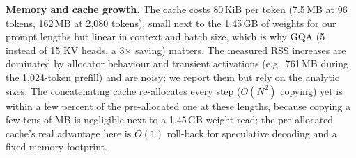 \textbf{Memory and cache growth.} The cache costs 80\,KiB per token (7.5\,MB at 96 tokens, 162\,MB at 2{,}080 tokens), small next to the 1.45\,GB of weights for our prompt lengths but linear in context and batch size, which is why GQA (5 instead of 15 KV heads, a 3$\times$ saving) matters. The measured RSS increases are dominated by allocator behaviour and transient activations (e.g.\ 761\,MB during the 1{,}024-token prefill) and are noisy; we report them but rely on the analytic sizes. The concatenating cache re-allocates every step ($O(N^2)$ copying) yet is within a few percent of the pre-allocated one at these lengths, because copying a few tens of MB is negligible next to a 1.45\,GB weight read; the pre-allocated cache's real advantage here is $O(1)$ roll-back for speculative decoding and a fixed memory footprint.
